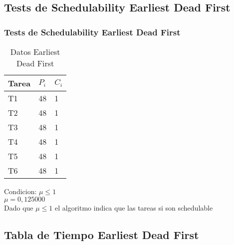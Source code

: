 \documentclass[xcolor=table]{beamer}
\begin{document}
\subsection{Tests de Schedulability  Earliest Dead First } 

\begin{frame} 
\frametitle{Tests de Schedulability  Earliest Dead First } 
\begin{table} 
\centering 
\begin{tabular}{|l|l|l|} 
\hline 
\cellcolor{lightgray}Tarea & \cellcolor{lightgray}$P_i$ & \cellcolor{lightgray}$C_i$ \\ \hline 
T1   & 48  &  1\\ \hline 
T2   & 48  &  1\\ \hline 
T3   & 48  &  1\\ \hline 
T4   & 48  &  1\\ \hline 
T5   & 48  &  1\\ \hline 
T6   & 48  &  1\\ \hline 
\end{tabular} 
\caption{Datos  Earliest Dead First } 
\end{table} 
Condicion: $\mu \leq 1$ \\ 
$\mu =  0,125000 $ \\ 
Dado que $\mu \leq 1$ el algoritmo indica que las tareas si son schedulable \\ 
\end{frame} 

\subsection{Tabla de Tiempo  Earliest Dead First } 
\end{document}
